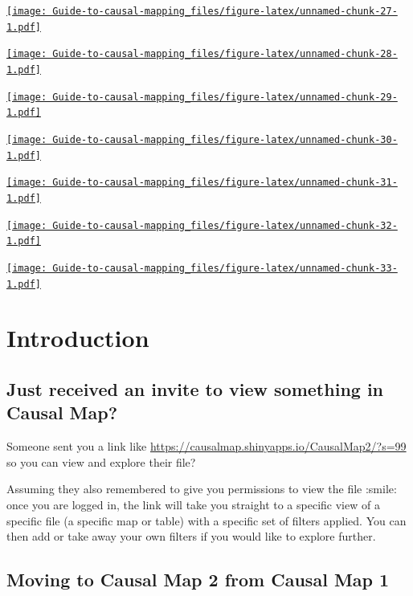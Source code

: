 \documentclass[
]{book}
\begin{document}
\href{https://player.vimeo.com/video/651173445}{\texttt{[image: Guide-to-causal-mapping\_files/figure-latex/unnamed-chunk-27-1.pdf]}}

\href{https://player.vimeo.com/video/604138709}{\texttt{[image: Guide-to-causal-mapping\_files/figure-latex/unnamed-chunk-28-1.pdf]}}

\href{https://player.vimeo.com/video/664879474}{\texttt{[image: Guide-to-causal-mapping\_files/figure-latex/unnamed-chunk-29-1.pdf]}}

\href{https://player.vimeo.com/video/599620015}{\texttt{[image: Guide-to-causal-mapping\_files/figure-latex/unnamed-chunk-30-1.pdf]}}

\href{https://player.vimeo.com/video/671894620}{\texttt{[image: Guide-to-causal-mapping\_files/figure-latex/unnamed-chunk-31-1.pdf]}}

\href{https://player.vimeo.com/video/637121851}{\texttt{[image: Guide-to-causal-mapping\_files/figure-latex/unnamed-chunk-32-1.pdf]}}

\href{https://player.vimeo.com/video/683770170}{\texttt{[image: Guide-to-causal-mapping\_files/figure-latex/unnamed-chunk-33-1.pdf]}}

\hypertarget{part-introduction}{%
\part{Introduction}\label{part-introduction}}

\hypertarget{xinvite}{%
\chapter{Just received an invite to view something in Causal Map?}\label{xinvite}}

Someone sent you a link like \url{https://causalmap.shinyapps.io/CausalMap2/?s=99} so you can view and explore their file?

Assuming they also remembered to give you permissions to view the file :smile: once you are logged in, the link will take you straight to a specific view of a specific file (a specific map or table) with a specific set of filters applied. You can then add or take away your own filters if you would like to explore further.

\hypertarget{moving-to-causal-map-2-from-causal-map-1}{%
\chapter{Moving to Causal Map 2 from Causal Map 1}\label{moving-to-causal-map-2-from-causal-map-1}}
\end{document}
